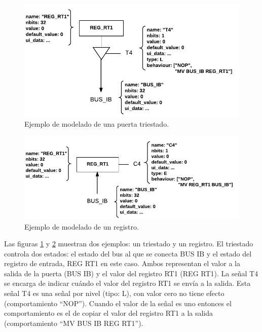 \begin{figure}[htbp]
 	\centering
 	\includegraphics[width=14cm]{figures/hardware_example_tristate}
 	\caption{Ejemplo de modelado de una puerta triestado.}
	\label{fig:hardware_tristate_example}
\end{figure}

\begin{figure}[htbp]
 	\centering
 	\includegraphics[width=14cm]{figures/hardware_example_register}
 	\caption{Ejemplo de modelado de un registro.}
	\label{fig:hardware_register_example}
\end{figure}

Las figuras \ref{fig:hardware_tristate_example} y \ref{fig:hardware_register_example} muestran dos ejemplos: un triestado y un registro.
El triestado controla dos estados: el estado del bus al que se conecta BUS IB y el estado del registro de entrada, REG RT1 en este caso. Ambos representan el valor a la salida de la puerta (BUS IB) y el valor del registro RT1 (REG RT1). La señal T4 se encarga de indicar cuándo el valor del registro RT1 se envía a la salida. Esta señal T4 es una señal por nivel (tipo: L), con valor cero no tiene efecto (comportamiento ``NOP''). Cuando el valor de la señal es uno entonces el comportamiento es el de copiar el valor del registro RT1 a la salida (comportamiento ``MV BUS IB REG RT1'').

